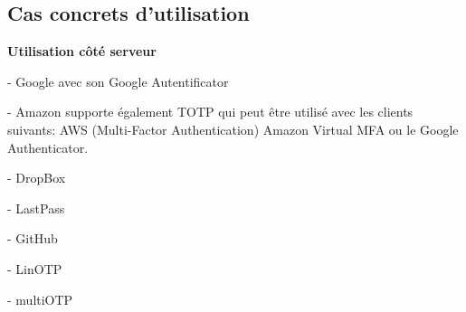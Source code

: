 \documentclass{../res/univ-projet}
\begin{document}
  \subsection{Cas concrets d'utilisation}
  \begin{description}
   \item \textbf{Utilisation côté serveur}
   \begin{description}
    \item - Google avec son Google Autentificator
    \item - Amazon supporte également TOTP qui peut être utilisé avec les clients suivants: AWS (Multi-Factor Authentication) Amazon Virtual MFA ou le Google Authenticator.
    \item - DropBox
    \item - LastPass
    \item - GitHub
    \item - LinOTP
    \item - multiOTP
   \end{description}


\end{description}
\end{document}
